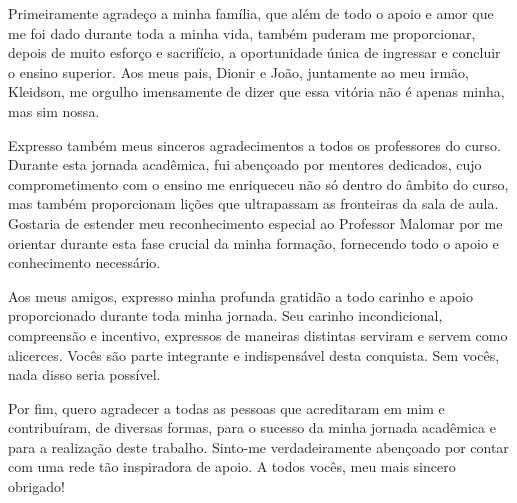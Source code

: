 
\begin{agradecimentos}[AGRADECIMENTOS]

Primeiramente agradeço a minha família, que além de todo o apoio e amor que me foi dado durante toda a minha vida, também puderam me proporcionar, depois de muito esforço e sacrifício, a oportunidade única de ingressar e concluir o ensino superior. Aos meus pais, Dionir e João, juntamente ao meu irmão, Kleidson, me orgulho imensamente de dizer que essa vitória não é apenas minha, mas sim nossa.

Expresso também meus sinceros agradecimentos a todos os professores do curso. Durante esta jornada acadêmica, fui abençoado por mentores dedicados, cujo comprometimento com o ensino me enriqueceu não só dentro do âmbito do curso, mas também proporcionam lições que ultrapassam as fronteiras da sala de aula. Gostaria de estender meu reconhecimento especial ao Professor Malomar por me orientar durante esta fase crucial da minha formação, fornecendo todo o apoio e conhecimento necessário.

Aos meus amigos, expresso minha profunda gratidão a todo carinho e apoio proporcionado durante toda minha jornada.  Seu carinho incondicional, compreensão e incentivo, expressos de maneiras distintas serviram e servem como alicerces. Vocês são parte integrante e indispensável desta conquista. Sem vocês, nada disso seria possível.

Por fim, quero agradecer a todas as pessoas que acreditaram em mim e contribuíram, de diversas formas, para o sucesso da minha jornada acadêmica e para a realização deste trabalho. Sinto-me verdadeiramente abençoado por contar com uma rede tão inspiradora de apoio. A todos vocês, meu mais sincero obrigado!

\end{agradecimentos}
